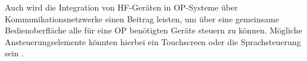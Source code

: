 \documentclass[letterpaper,12pt]{article}
\begin{document}
		Auch wird die Integration von HF-Geräten in OP-Systeme über Kommunikationsnetzwerke einen Beitrag leisten, um über eine gemeinsame Bedienoberfläche alle für eine OP benötigten Geräte steuern zu können. Mögliche Ansteuerungselemente könnten hierbei ein Touchscreen oder die Sprachsteuerung sein \cite{kramme2016medizintechnik}.
		
		

	\newpage
	
	
		
\end{document}
